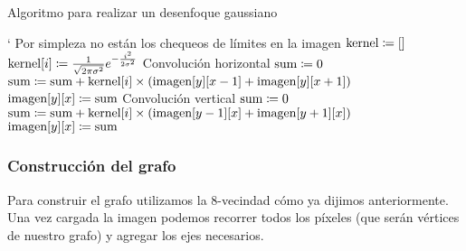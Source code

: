 \begin{algorithm}[H]
\caption{Algoritmo para realizar un desenfoque gaussiano}
\begin{algorithmic}[1]
\Statex{}
`
	\Statex{} \Comment{} Por simpleza no están los chequeos de límites en la imagen
	\State{} $\text{kernel} \coloneqq []$
		\State{} $\text{kernel}[i]
			\coloneqq \frac{1}{\sqrt{2\pi\sigma^2}}e^{-\frac{i^2}{2\sigma^2}}$
	\EndFor{}
		\Comment{} Convolución horizontal
			\State{} $\text{sum} \coloneqq 0$
				\State{} $\text{sum} \coloneqq \text{sum}
					+ \text{kernel}[i] \times (
						\text{imagen}[y][x - 1]
						+ \text{imagen}[y][x + 1]
					)$
			\EndFor{}
			\State{} $\text{imagen}[y][x] \coloneqq \text{sum}$
		\EndFor{}
	\EndFor{}
		\Comment{} Convolución vertical
			\State{} $\text{sum} \coloneqq 0$
				\State{} $\text{sum} \coloneqq \text{sum}
					+ \text{kernel}[i] \times (
						\text{imagen}[y - 1][x]
						+ \text{imagen}[y + 1][x]
					)$
			\EndFor{}
			\State{} $\text{imagen}[y][x] \coloneqq \text{sum}$
		\EndFor{}
	\EndFor{}
\EndFunction{}
\end{algorithmic}
\end{algorithm}

\subsubsection{Construcción del grafo}

Para construir el grafo utilizamos la 8-vecindad cómo ya dijimos anteriormente.
Una vez cargada la imagen podemos recorrer todos los píxeles (que serán
vértices de nuestro grafo) y agregar los ejes necesarios.

